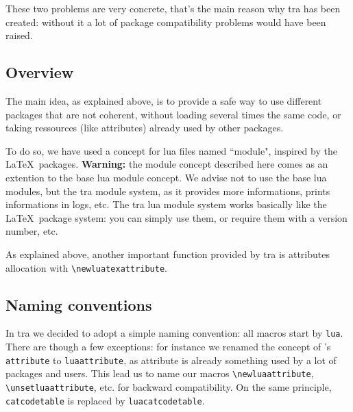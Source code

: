 \documentclass{article}
\newcommand\code{\texttt}
\begin{document}
These two problems are very concrete, that's the main reason why \LuaTeX tra
has been created: without it a lot of package compatibility problems would
have been raised.

\subsection{Overview}

The main idea, as explained above, is to provide a safe way to use different
packages that are not coherent, without loading several times the same code,
or taking ressources (like attributes) already used by other packages.

To do so, we have used a concept for lua files named ``module", inspired by
the \LaTeX\ packages. \textbf{Warning:} the module concept described here
comes as an extention to the base lua module concept. We advise not to use the
base lua modules, but the \LuaTeX tra module system, as it provides more
informations, prints informations in logs, etc. The \LuaTeX tra lua module
system works basically like the \LaTeX\ package system: you can simply use
them, or require them with a version number, etc.

As explained above, another important function provided by \LuaTeX tra is
attributes allocation with \verb+\newluatexattribute+.

\subsection{Naming conventions}

In \LuaTeX tra we decided to adopt a simple naming convention: all macros
start by \code{lua}. There are though a few exceptions: for instance we
renamed the concept of \LuaTeX 's \code{attribute} to \code{luaattribute},
as attribute is already something used by a lot of packages and users. This
lead us to name our macros \verb+\newluaattribute+,
\verb+\unsetluaattribute+, etc. for backward compatibility. On the
same principle, \code{catcodetable} is replaced by \code{luacatcodetable}.
\end{document}
